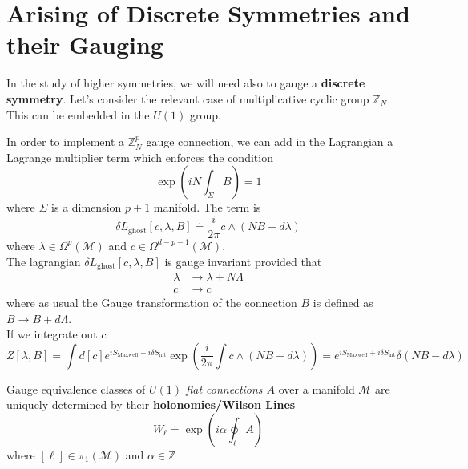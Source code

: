\section{Arising of Discrete Symmetries and their Gauging}
In the study of higher symmetries, we will need also to gauge a \textbf{discrete symmetry}. Let's consider the relevant case of multiplicative cyclic group $\mathbb{Z}_N$. This can be embedded in the $U(1)$ group.

In order to implement a $\mathbb{Z}^p_N$ gauge connection, we can add in the Lagrangian a Lagrange multiplier term which enforces the condition
\begin{equation}
    \exp(i N \int_{\Sigma} B) =1
\end{equation}
where $\Sigma$ is a dimension $p+1$ manifold. The term is
\begin{equation}
    \delta L_{\text{ghost}}[c, \lambda, B] \doteq \frac{i}{2 \pi} c \wedge ( N B - d \lambda)
\end{equation}
where $\lambda \in \Omega^p(\mathcal{M})$ and $c \in \Omega^{d-p-1}(\mathcal{M})$. \\
The lagrangian $\delta L_{\text{ghost}}[c, \lambda, B]$ is gauge invariant provided that
\begin{equation}
\begin{aligned}
    \lambda &\to \lambda + N \Lambda\\
    c &\to c
    \end{aligned}
\end{equation}
where as usual the Gauge transformation of the connection $B$ is defined as $B \to B + d \Lambda$. \\
If we integrate out $c$
\begin{equation}
    Z[\lambda, B] = \int d[c] e^{i S_{\text{Maxwell}} + i \delta S_{\text{int}}} \exp(\frac{i}{2 \pi} \int  c \wedge ( N B - d \lambda) ) = e^{i S_{\text{Maxwell}} + i \delta S_{\text{int}}} \delta(NB - d \lambda)
\end{equation}

\begin{thm}{}{}
\label{thm1}
Gauge equivalence classes of \textit{$U(1)$ flat connections $A$} over a manifold $\mathcal{M}$ are uniquely determined by their \textbf{holonomies/Wilson Lines}
\begin{equation}
    W_{\ell} \doteq \exp(i \alpha \oint_{\ell} A)
\end{equation}
where $[\ell] \in \pi_1(\mathcal{M})$ and $\alpha \in \mathbb{Z}$
\end{thm}

